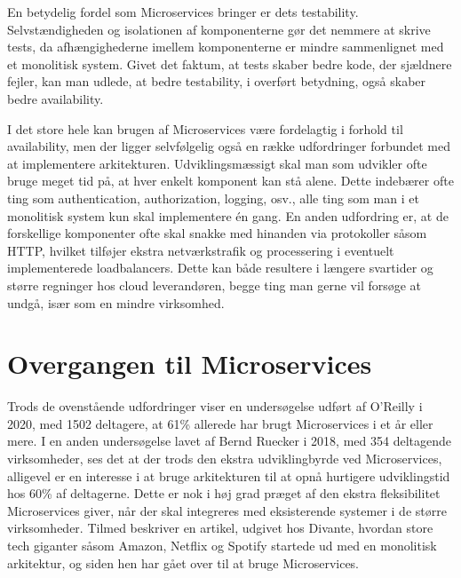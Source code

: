 \documentclass{article}
\begin{document}
\begin{flushleft}
En betydelig fordel som Microservices bringer er dets testability. Selvstændigheden og isolationen af komponenterne gør det nemmere at skrive tests, da afhængighederne imellem komponenterne er mindre sammenlignet med et monolitisk system.\cite{micro4} Givet det faktum, at tests skaber bedre kode, der sjældnere fejler\cite{micro5}, kan man udlede, at bedre testability, i overført betydning, også skaber bedre availability.\linebreak

I det store hele kan brugen af Microservices være fordelagtig i forhold til availability, men der ligger selvfølgelig også en række udfordringer forbundet med at implementere arkitekturen. Udviklingsmæssigt skal man som udvikler ofte bruge meget tid på, at hver enkelt komponent kan stå alene. Dette indebærer ofte ting som authentication, authorization, logging, osv., alle ting som man i et monolitisk system kun skal implementere én gang.\cite{micro6} En anden udfordring er, at de forskellige komponenter ofte skal snakke med hinanden via protokoller såsom HTTP, hvilket tilføjer ekstra netværkstrafik og processering i eventuelt implementerede loadbalancers. Dette kan både resultere i længere svartider og større regninger hos cloud leverandøren, begge ting man gerne vil forsøge at undgå, især som en mindre virksomhed.\cite{micro7}

\section*{Overgangen til Microservices}
Trods de ovenstående udfordringer viser en undersøgelse udført af O'Reilly\cite{oreilly} i 2020, med 1502 deltagere\cite{research}, at 61\% allerede har brugt Microservices i et år eller mere. I en anden undersøgelse lavet af Bernd Ruecker i 2018, med 354 deltagende virksomheder\cite{research2}, ses det at der trods den ekstra udviklingbyrde ved Microservices, alligevel er en interesse i at bruge arkitekturen til at opnå hurtigere udviklingstid hos 60\% af deltagerne. Dette er nok i høj grad præget af den ekstra fleksibilitet Microservices giver, når der skal integreres med eksisterende systemer i de større virksomheder. Tilmed beskriver en artikel\cite{mono3}, udgivet hos Divante\cite{divante}, hvordan store tech giganter såsom Amazon, Netflix og Spotify startede ud med en monolitisk arkitektur, og siden hen har gået over til at bruge Microservices.


\end{flushleft}
\end{document}
